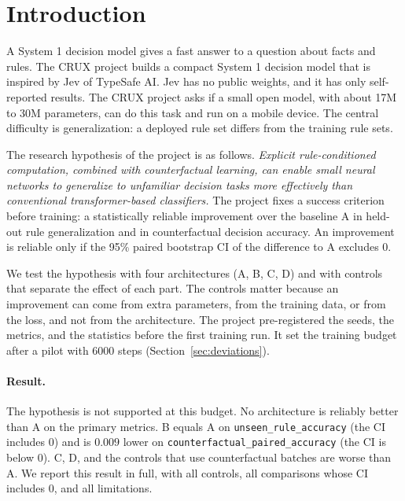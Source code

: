 \documentclass[11pt,a4paper]{article}
\newcommand{\ura}{\texttt{unseen\_\allowbreak rule\_\allowbreak accuracy}}
\newcommand{\cpa}{\texttt{counterfactual\_\allowbreak paired\_\allowbreak accuracy}}
\begin{document}
\section{Introduction}

A System 1 decision model gives a fast answer to a question about facts and rules.
The CRUX project builds a compact System 1 decision model that is inspired by Jev of TypeSafe AI.
Jev has no public weights, and it has only self-reported results.
The CRUX project asks if a small open model, with about 17M to 30M parameters, can do this task and run on a mobile device.
The central difficulty is generalization: a deployed rule set differs from the training rule sets.

The research hypothesis of the project is as follows.
\emph{Explicit rule-conditioned computation, combined with counterfactual learning, can enable small neural networks to generalize to unfamiliar decision tasks more effectively than conventional transformer-based classifiers.}
The project fixes a success criterion before training: a statistically reliable improvement over the baseline A in held-out rule generalization and in counterfactual decision accuracy.
An improvement is reliable only if the 95\% paired bootstrap CI of the difference to A excludes 0.

We test the hypothesis with four architectures (A, B, C, D) and with controls that separate the effect of each part.
The controls matter because an improvement can come from extra parameters, from the training data, or from the loss, and not from the architecture.
The project pre-registered the seeds, the metrics, and the statistics before the first training run.
It set the training budget after a pilot with 6000 steps (Section~\ref{sec:deviations}).

\paragraph{Result.}
The hypothesis is not supported at this budget.
No architecture is reliably better than A on the primary metrics.
B equals A on \ura{} (the CI includes 0) and is $0.009$ lower on \cpa{} (the CI is below 0).
C, D, and the controls that use counterfactual batches are worse than A.
We report this result in full, with all controls, all comparisons whose CI includes 0, and all limitations.
\end{document}
